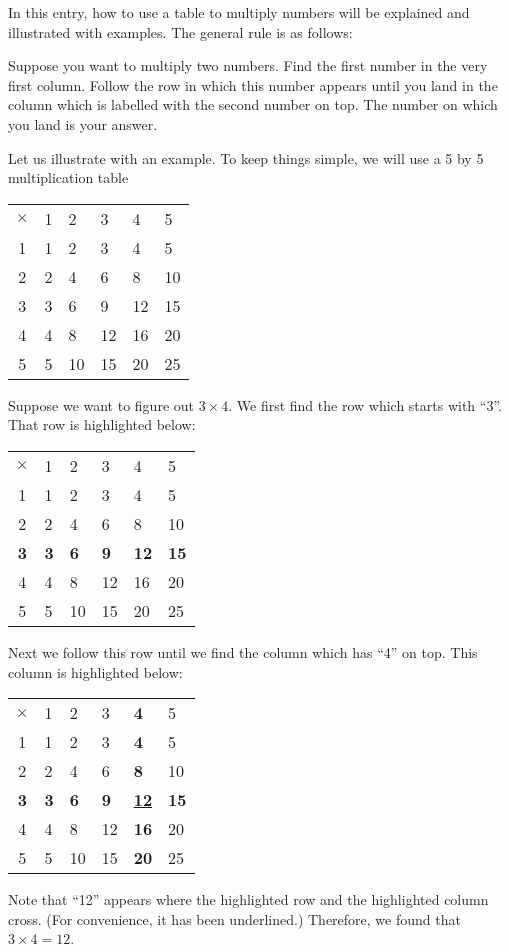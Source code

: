 \documentclass[12pt]{article}
\begin{document}
In this entry, how to use a table to multiply numbers will be explained and illustrated with examples.  The general rule is as follows:

Suppose you want to multiply two numbers.  Find the first number
in the very first column. Follow the row in which this number appears
until you land in the column which is labelled with the second number on
top. The number on which you land is your answer.

Let us illustrate with an example.  To keep things simple, we will
use a 5 by 5 multiplication table

\begin{tabular}
{|c|l|l|l|l|l|}
$\times$ & 1 & 2 & 3 & 4 & 5 \\
1 & 1 & 2 & 3 & 4 & 5 \\
2 & 2 & 4 & 6 & 8 & 10 \\
3 & 3 & 6 & 9 & 12 & 15 \\
4 & 4 & 8 & 12 & 16 & 20 \\
5 & 5 & 10 & 15 & 20 & 25 \\
\end{tabular}

Suppose we want to figure out $3 \times 4$.  We first find the
row which starts with ``3''.  That row is highlighted below:

\begin{tabular}
{|c|l|l|l|l|l|}
$\times$ & 1 & 2 & 3 & 4 & 5 \\
1 & 1 & 2 & 3 & 4 & 5 \\
2 & 2 & 4 & 6 & 8 & 10 \\
{\bf 3} & {\bf 3} & {\bf 6} & {\bf 9} & {\bf 12} & {\bf 15} \\
4 & 4 & 8 & 12 & 16 & 20 \\
5 & 5 & 10 & 15 & 20 & 25 \\
\end{tabular}

Next we follow this row until we find the column which has ``4''
on top.  This column is highlighted below:

\begin{tabular}
{|c|l|l|l|l|l|}
$\times$ & 1 & 2 & 3 & {\bf 4} & 5 \\
1 & 1 & 2 & 3 & {\bf 4} & 5 \\
2 & 2 & 4 & 6 & {\bf 8} & 10 \\
{\bf 3} & {\bf 3} & {\bf 6} & {\bf 9} & \underline{\bf 12} & {\bf 15} \\
4 & 4 & 8 & 12 & {\bf 16} & 20 \\
5 & 5 & 10 & 15 & {\bf 20} & 25 \\
\end{tabular}

Note that ``12'' appears where the highlighted row and the highlighted
column cross.  (For convenience, it has been underlined.) Therefore, 
we found that $3 \times 4 = 12$.
\end{document}
